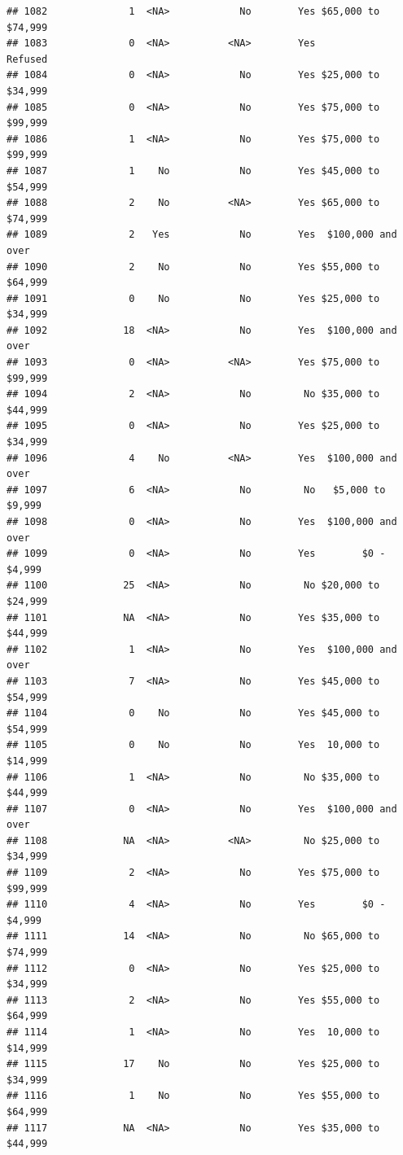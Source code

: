 \documentclass[man]{apa6}
\begin{document}
\begin{verbatim}
## 1082              1  <NA>            No        Yes $65,000 to $74,999
## 1083              0  <NA>          <NA>        Yes            Refused
## 1084              0  <NA>            No        Yes $25,000 to $34,999
## 1085              0  <NA>            No        Yes $75,000 to $99,999
## 1086              1  <NA>            No        Yes $75,000 to $99,999
## 1087              1    No            No        Yes $45,000 to $54,999
## 1088              2    No          <NA>        Yes $65,000 to $74,999
## 1089              2   Yes            No        Yes  $100,000 and over
## 1090              2    No            No        Yes $55,000 to $64,999
## 1091              0    No            No        Yes $25,000 to $34,999
## 1092             18  <NA>            No        Yes  $100,000 and over
## 1093              0  <NA>          <NA>        Yes $75,000 to $99,999
## 1094              2  <NA>            No         No $35,000 to $44,999
## 1095              0  <NA>            No        Yes $25,000 to $34,999
## 1096              4    No          <NA>        Yes  $100,000 and over
## 1097              6  <NA>            No         No   $5,000 to $9,999
## 1098              0  <NA>            No        Yes  $100,000 and over
## 1099              0  <NA>            No        Yes        $0 - $4,999
## 1100             25  <NA>            No         No $20,000 to $24,999
## 1101             NA  <NA>            No        Yes $35,000 to $44,999
## 1102              1  <NA>            No        Yes  $100,000 and over
## 1103              7  <NA>            No        Yes $45,000 to $54,999
## 1104              0    No            No        Yes $45,000 to $54,999
## 1105              0    No            No        Yes  10,000 to $14,999
## 1106              1  <NA>            No         No $35,000 to $44,999
## 1107              0  <NA>            No        Yes  $100,000 and over
## 1108             NA  <NA>          <NA>         No $25,000 to $34,999
## 1109              2  <NA>            No        Yes $75,000 to $99,999
## 1110              4  <NA>            No        Yes        $0 - $4,999
## 1111             14  <NA>            No         No $65,000 to $74,999
## 1112              0  <NA>            No        Yes $25,000 to $34,999
## 1113              2  <NA>            No        Yes $55,000 to $64,999
## 1114              1  <NA>            No        Yes  10,000 to $14,999
## 1115             17    No            No        Yes $25,000 to $34,999
## 1116              1    No            No        Yes $55,000 to $64,999
## 1117             NA  <NA>            No        Yes $35,000 to $44,999

\end{verbatim}
\end{document}
